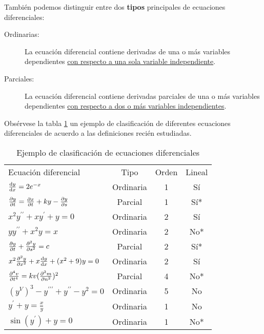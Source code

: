 \documentclass[12pt]{article} %
\begin{document}
También podemos distinguir entre dos \textbf{tipos} principales de ecuaciones diferenciales:
\begin{description}
  \item[Ordinarias:] La ecuación diferencial contiene derivadas de una o más variables dependientes 
    \underline{con respecto a una sola variable independiente}.
  \item[Parciales:] La ecuación diferencial contiene derivadas parciales de una o más variables dependientes
    \underline{con respecto a dos o más variables independientes}.
\end{description}

Obsérvese la tabla \ref{tab:EjemploClasificacion} un ejemplo de clasificación de diferentes ecuaciones diferenciales de acuerdo a las definiciones 
recién estudiadas.

\begin{table}
  \centering
  \caption{Ejemplo de clasificación de ecuaciones diferenciales}
  \label{tab:EjemploClasificacion}
  \begin{tabular}{lccc}
    Ecuación diferencial & Tipo & Orden & Lineal \\[0.5em]
    $\dv{y}{x} = 2e^{-x}$ & Ordinaria & 1 & Sí \\[0.6em]
    $\pdv{y}{t} = \pdv{x}{t} + ky - \pdv{y}{s}$ & Parcial & 1 & Sí* \\[0.6em]
    $x^2y^{\prime \prime} + xy^{\prime} + y = 0$ & Ordinaria & 2 & Sí \\[0.6em]
    $yy^{\prime \prime} + x^2y = x$ & Ordinaria & 2 & No* \\[0.6em]
    $\pdv{y}{t} + \pdv[2]{y}{s} = c$ &Parcial & 2 & Sí* \\[0.6em]
    $x^2 \pdv[2]{y}{x} + x \dv{y}{x} + (x^2 + 9)y = 0$ & Ordinaria & 2 & Sí \\[0.6em]
    $\pdv[4]{v}{t} = kv(\pdv[2]{m}{n})^2$ & Parcial & 4 & No* \\[0.6em]
    $(y^V)^3 - y^{\prime \prime \prime} + y^{\prime \prime} - y^2 = 0$ & Ordinaria & 5 & No \\[0.6em]
    $y^{\prime} + y = \frac{x}{y}$ & Ordinaria & 1 & No \\[0.6em]
    $\sin (y^{\prime}) + y = 0$ & Ordinaria & 1 & No*
  \end{tabular}
\end{table}
\end{document}
